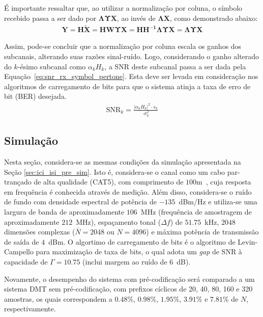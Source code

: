 É importante ressaltar que, ao utilizar a normalização por coluna, o símbolo recebido passa a ser dado por $\mathbf{\Lambda \Upsilon X}$, ao invés de $\mathbf{\Lambda X}$, como demonstrado abaixo:
\begin{align}
\mathbf{Y} = \mathbf{H\tilde{X}} = \mathbf{HW\Upsilon X} = \mathbf{H H^{-1} \Lambda \Upsilon  X} = \mathbf{\Lambda \Upsilon X}\nonumber
\end{align}

Assim, pode-se concluir que a normalização por coluna escala os ganhos dos subcanais, alterando suas razões sinal-ruído. Logo, considerando o ganho alterado do $k$-ésimo subcanal como $\alpha_k H_k$, a SNR deste subcanal passa a ser dada pela Equação~\ref{eq:snr_rx_symbol_pertone}. Esta deve ser levada em consideração nos algoritmos de carregamento de bits para que o sistema atinja a taxa de erro de bit (BER) desejada.
\begin{align}
\text{SNR}_k= \frac{\left| \alpha_k H_k \right|^2 \cdot s_k}{ \cdot \sigma_k^2 }
\label{eq:snr_rx_symbol_pertone}
\end{align}


\subsection{Simulação}

Nesta seção, considera-se as mesmas condições da simulação apresentada na Seção \ref{sec:ici_isi_pre_sim}. Isto é, considera-se o canal como um cabo par-trançado de alta qualidade (CAT5), com comprimento de $100$m~, cuja resposta em frequência é conhecida através de medição. Além disso, considera-se o ruído de fundo com densidade espectral de potência de $-135$~dBm/Hz e utiliza-se uma largura de banda de aproximadamente $106$~MHz (frequência de amostragem de aproximadamente $212$~MHz), espaçamento tonal ($\Delta f$) de $51.75$~kHz, $2048$ dimensões complexas ($\bar{N}=2048$ ou $N=4096$) e máxima potência de transmissão de saída de $4$~dBm. O algortimo de carregamento de bits é o algoritmo de Levin-Campello para maximização de taxa de bits, o qual adota um \textsl{gap} de SNR à capacidade de  $\Gamma = 10.75$ (inclui margem ao ruído de $6$~dB).

Novamente, o desempenho do sistema com pré-codificação será comparado a um sistema DMT sem pré-codificação, com prefixos cíclicos de 20, 40, 80, 160 e 320 amostras, os quais correspondem a $0.48\%$, $0.98\%$, $1.95\%$, $3.91\%$ e $7.81\%$ de $N$, respectivamente.

